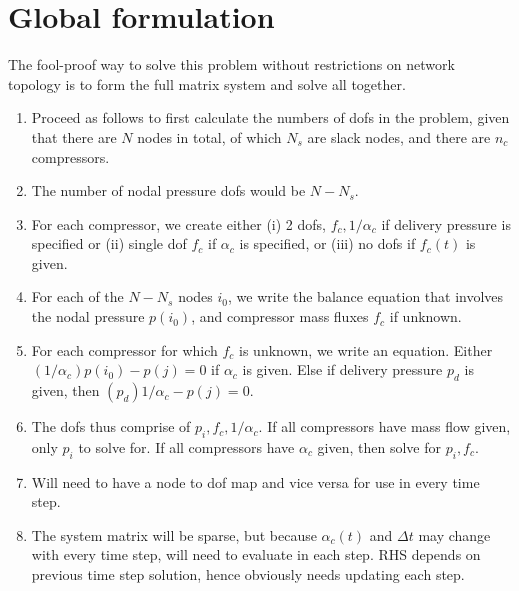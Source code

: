 \documentclass{amsart}
\begin{document}
\section{Global formulation}

The fool-proof way to solve this problem without restrictions on network topology is to form the full matrix system and solve all together.
\begin{enumerate}
\item Proceed as follows to first calculate the numbers of dofs in the problem, given that there are $N$ nodes in total, of which $N_s$ are slack nodes, and there are $n_c$ compressors.
\item The number of nodal pressure dofs would be $N - N_s$. 
\item For each compressor, we create either (i) 2 dofs, $f_c, 1/\alpha_c$ if delivery pressure is specified or (ii) single dof $f_c$ if $\alpha_c$ is specified, or (iii) no dofs if $f_c(t)$ is given.
\item For each of the $N- N_s$ nodes $i_0$, we write the balance equation that involves the nodal pressure $p(i_0)$, and compressor mass fluxes $f_c$ if unknown. 
\item For each compressor for which $f_c$ is unknown, we write an equation. Either $(1/\alpha_c)p(i_0) - p(j) = 0$ if $\alpha_c$ is given. Else if delivery pressure $p_d$ is given, then $(p_d)1/\alpha_c - p(j) = 0$.
\item The dofs thus comprise of $p_i, f_c, 1/\alpha_c$. If all compressors have mass flow given, only $p_i$ to solve for. If all compressors have $\alpha_c$ given, then solve for $p_i, f_c$.
\item Will need to have a node to dof map and vice versa for use in every time step.
\item The system matrix will be sparse, but because $\alpha_c(t)$ and $\Delta t$ may change with every time step, will need to evaluate in each step. RHS depends on previous time step solution, hence obviously needs updating each step.

\end{enumerate}
\end{document}
